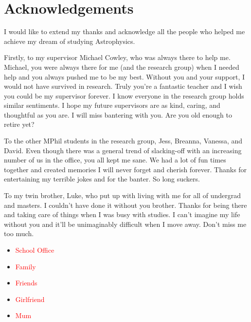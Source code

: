 \chapter{Acknowledgements}
\thispagestyle{empty}

I would like to extend my thanks and acknowledge all the people who helped me achieve my dream of studying Astrophysics.

Firstly, to my supervisor Michael Cowley, who was always there to help me. Michael, you were always there for me (and the research group) when I needed help and you always pushed me to be my best. Without you and your support, I would not have survived in research. Truly you're a fantastic teacher and I wish you could be my supervisor forever. I know everyone in the research group holds similar sentiments. I hope my future supervisors are as kind, caring, and thoughtful as you are. I will miss bantering with you. Are you old enough to retire yet?  

To the other MPhil students in the research group, Jess, Breanna, Vanessa, and David. Even though there was a general trend of slacking-off with an increasing number of us in the office, you all kept me sane. We had a lot of fun times together and created memories I will never forget and cherish forever. Thanks for entertaining my terrible jokes and for the banter. So long suckers.

To my twin brother, Luke, who put up with living with me for all of undergrad and masters. I couldn't have done it without you brother. Thanks for being there and taking care of things when I was busy with studies. I can't imagine my life without you and it'll be unimaginably difficult when I move away. Don't miss me too much.

\begin{itemize}
    \item \textcolor{red}{School Office}
    \item \textcolor{red}{Family}
    \item \textcolor{red}{Friends}
    \item \textcolor{red}{Girlfriend}
    \item \textcolor{red}{Mum}
\end{itemize}